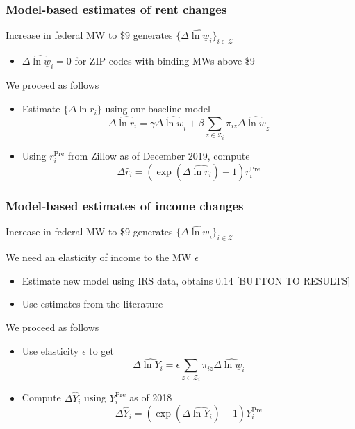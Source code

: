 \documentclass[aspectratio=169, t]{beamer}
\newcommand{\Z}{\mathcal{Z}}
\newcommand{\MW}{\underline{w}}
\begin{document}
\begin{frame}
    \frametitle{Model-based estimates of rent changes}
    
    Increase in federal MW to \$9 generates $\{\Delta \hat{\ln \MW}_i\}_{i\in\Z}$
    \begin{itemize}
    	\item $\Delta \hat{\ln \MW}_i=0$ for ZIP codes with binding MWs above \$9
    \end{itemize}
    
    \pause
	\vspace{3mm}
	We proceed as follows
	\vspace{1mm}
	\begin{itemize}
		\item Estimate $\{\Delta \ln r_i\}$ using our baseline model
		\begin{equation*}
			\Delta \hat{\ln r_i} = \gamma \Delta \hat{\ln \MW}_i + \beta \sum_{z\in\Z_i} \pi_{iz} \Delta \hat{\ln \MW}_z
		\end{equation*}
		\item Using $r^{\text{Pre}}_i$ from Zillow as of December 2019, compute 
		$$\Delta \hat r_i = \left(\exp(\Delta \hat{\ln r_i}) - 1 \right) r_i^{\text{Pre}}$$
	\end{itemize}

\end{frame}

\begin{frame}
	\frametitle{Model-based estimates of income changes}
	
	Increase in federal MW to \$9 generates $\{\Delta \hat{\ln \MW}_i\}_{i\in\Z}$
	
	\pause
	\vspace{3mm}
	We need an elasticity of income to the MW $\epsilon$
	\begin{itemize}
		\item Estimate new model using IRS data, obtains $0.14$ [BUTTON TO RESULTS]
		\vspace{1mm} 
		\item Use estimates from the literature \parencite{CegnizEtAl2019}
	\end{itemize}

	\pause
	\vspace{3mm}
	We proceed as follows
	\begin{itemize}
		\item Use elasticity $\epsilon$ to get
		\begin{equation*}
			\Delta \hat{\ln Y}_i = \epsilon \sum_{z\in\Z_i} \pi_{iz} \Delta \hat{\ln \MW}_i
		\end{equation*}
		\vspace{1mm} 
		\item Compute $\Delta \hat Y_i$ using $Y_i^{\text{Pre}}$ as of 2018
		$$\Delta \hat Y_i = \left(\exp(\Delta \hat{\ln Y_i}) - 1 \right) Y_i^{\text{Pre}}$$
	\end{itemize}
\end{frame}
\end{document}
